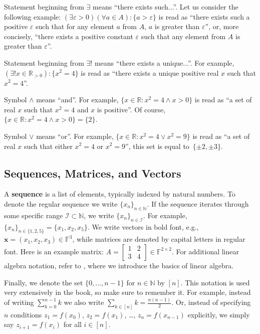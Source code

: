 \documentclass[../lecture-notes-148x210.tex]{subfiles}
\begin{document}
Statement beginning from $\exists$ means ``there exists such...''. Let us consider the following example: 
$(\exists \varepsilon > 0) (\forall a \in A): \{a > \varepsilon\}$ is read as ``there exists such a positive $\varepsilon$ such 
that for any element $a$ from $A$, $a$ is greater than $\varepsilon$'', or, more concisely, ``there exists a positive constant 
$\varepsilon$ such that any element from $A$ is greater than $\varepsilon$''.

Statement beginning from $\exists !$ means ``there exists a unique...''. For example, $(\exists! x \in \mathbb{R}_{>0}): \{x^2 = 4\}$ 
is read as ``there exists a unique positive real $x$ such that $x^2 = 4$''.

Symbol $\wedge$ means ``and''. For example, $\{x \in \mathbb{R}: x^2 = 4 \wedge x > 0\}$ is read as ``a set of real $x$ such that 
$x^2=4$ and $x$ is positive''. Of course, $\{x \in \mathbb{R}: x^2 = 4 \wedge x > 0\} = \{2\}$.

Symbol $\vee$ means ``or''. For example, $\{x \in \mathbb{R}: x^2 = 4 \vee x^2 = 9\}$ is read as ``a set of real $x$ such that 
either $x^2=4$ or $x^2=9$'', this set is equal to~$\{\pm 2, \pm 3\}$.

\subsection*{Sequences, Matrices, and Vectors}

A \textbf{sequence} is a list of elements, typically indexed by natural numbers.
To denote the regular sequence we write $\{x_n\}_{n \in \mathbb{N}}$. If the
sequence iterates through some specific range $\mathcal{I} \subset \mathbb{N}$,
we write $\{x_n\}_{n \in \mathcal{I}}$. For example, $\{x_n\}_{n \in \{1,2,5\}}
= \{x_1, x_2, x_5\}$. We write vectors in bold font, e.g., $\mathbf{x} = (x_1,
x_2, x_3) \in \mathbb{F}^3$, while matrices are denoted by capital letters in
regular font. Here is an example matrix: $A = \begin{bmatrix} 1 & 2 \\ 3 & 4
\end{bmatrix} \in \mathbb{F}^{2 \times 2}$. For additional linear algebra notation,
refer to , where we introduce the basics of linear algebra.

Finally, we denote the set $\{0,\dots,n-1\}$ for $n \in \mathbb{N}$ by $[n]$.
This notation is used very extensively in the book, so make sure to remember it.
For example, instead of writing $\sum_{k=0}^{n-1}k$ we also write $\sum_{k \in
[n]}k = \frac{n(n-1)}{2}$. Or, instead of specifying $n$ conditions
$z_1=f(x_0)$, $z_2=f(x_1)$, \dots, $z_n=f(x_{n-1})$ explicitly, we simply say
$z_{i+1} = f(x_i)$ for all $i \in [n]$.
\end{document}
